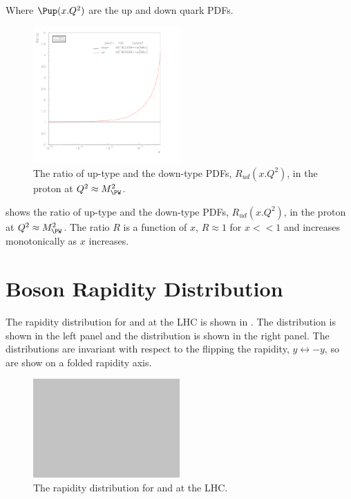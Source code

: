 Where $\Pup(x.Q^2)$ are the up and down quark \acp{PDF}.

\begin{figure}[htb]
  \centering
  \includegraphics[width=0.5\textwidth]{plot_pdf_ratio}
  \caption{The ratio of up-type and the down-type \acp{PDF}, $R_{ud}(x.Q^2)$,
  in the proton at $Q^2\approx M_{\PW}^2$.}
  \label{wbos:pdfrat}
\end{figure}

 shows the ratio of up-type and the down-type \acp{PDF},
$R_{ud}(x.Q^2)$, in the proton at $Q^2\approx M_{\PW}^2$. 
The ratio $R$ is a function of $x$, $R \approx 1$ for $x<<1$ and increases
monotonically as $x$ increases.  

\section{\PW Boson Rapidity Distribution}
\label{wbos:wrapsec}

The rapidity distribution for \PWp and \PWm at the \ac{LHC} is shown in
. 
The \PWm distribution is shown in the left panel and the \PWp distribution is
shown in the right panel. The distributions are invariant with respect to the
flipping the rapidity, $y\leftrightarrow-y$, so are show on a folded rapidity
axis.

\begin{figure}[htb]
  \centering
  \includegraphics[width=0.5\textwidth]{placeholder}
  \caption{The rapidity distribution for \PWp and \PWm at the LHC.}
  \label{wbos:wrapid}
\end{figure}

